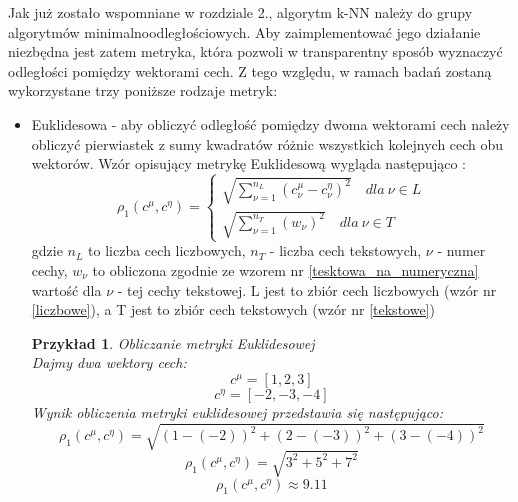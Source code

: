 \documentclass{classrep}
\newtheorem{exmp}{Przykład}[section]
\begin{document}
 
 Jak już zostało wspomniane w rozdziale 2., algorytm k-NN należy do grupy algorytmów minimalnoodległościowych. Aby zaimplementować jego działanie niezbędna jest zatem metryka, która pozwoli w transparentny sposób wyznaczyć odległości pomiędzy wektorami cech. Z tego względu, w ramach badań zostaną wykorzystane trzy poniższe rodzaje metryk:
 \begin{itemize}
    \item Euklidesowa - aby obliczyć odległość pomiędzy dwoma wektorami cech należy obliczyć pierwiastek z sumy kwadratów różnic wszystkich kolejnych cech obu wektorów. Wzór opisujący metrykę Euklidesową wygląda następująco \cite{tadeusiewicz90}:
    \begin{equation}
    \label{eqn:euklides}
        \rho_1(c^\mu, c^\eta)= \left\{\begin{matrix} \sqrt{\sum_{\nu=1}^{n_L}(c_{\nu}^\mu - c_{\nu}^\eta)^2} \quad dla \: \nu \in L \\ \sqrt{\sum_{\nu=1}^{n_T}(w_{\nu})^2} \quad dla \: \nu \in T \end{matrix}\right.
    \end{equation}
    \indent gdzie $n_L$ to liczba cech liczbowych, $n_T$ - liczba cech tekstowych, $\nu$ - numer cechy, $w_{\nu}$ to obliczona zgodnie ze wzorem nr \ref{tesktowa_na_numeryczna} wartość dla $\nu$ - tej cechy tekstowej. L jest to zbiór cech liczbowych (wzór nr \ref{liczbowe}), a T jest to zbiór cech tekstowych (wzór nr \ref{tekstowe})  \\
    \begin{exmp} Obliczanie metryki Euklidesowej  \\
        Dajmy dwa wektory cech:
        \begin{equation}
            c^\mu = [1, 2, 3]
        \end{equation}
        \begin{equation}
            c^\eta = [-2, -3, -4]
        \end{equation}
        Wynik obliczenia metryki euklidesowej przedstawia się następująco:
        \begin{equation}
            \rho_{1}(c^\mu, c^\eta) = \sqrt{(1 - (-2))^2 + (2 - (-3))^2 + (3 - (-4))^2}
        \end{equation}
        \begin{equation}
            \rho_{1}(c^\mu, c^\eta) = \sqrt{3^2 + 5^2 + 7^2}
        \end{equation} 
        \begin{equation}
            \rho_{1}(c^\mu, c^\eta) \approx 9.11

\end{equation}
\end{exmp}
\end{itemize}
\end{document}

